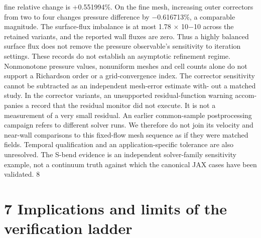 \documentclass[11pt]{article}
\begin{document}
fine relative change is +0.551994\%. On the fine mesh, increasing outer correctors from two to four
changes pressure difference by \ensuremath{-}0.616713\%, a comparable magnitude. The surface-flux imbalance
is at most 1.78 \ensuremath{\times} 10\ensuremath{-}10 across the retained variants, and the reported wall fluxes are zero. Thus
a highly balanced surface flux does not remove the pressure observable’s sensitivity to iteration
settings.
These records do not establish an asymptotic refinement regime. Nonmonotone pressure values,
nonuniform meshes and cell counts alone do not support a Richardson order or a grid-convergence
index. The corrector sensitivity cannot be subtracted as an independent mesh-error estimate with-
out a matched study. In the corrector variants, an unsupported residual-function warning accom-
panies a record that the residual monitor did not execute. It is not a measurement of a very small
residual.
An earlier common-sample postprocessing campaign refers to different solver runs. We therefore
do not join its velocity and near-wall comparisons to this fixed-flow mesh sequence as if they were
matched fields. Temporal qualification and an application-specific tolerance are also unresolved.
The S-bend evidence is an independent solver-family sensitivity example, not a continuum truth
against which the canonical JAX cases have been validated.
8


\section*{7 Implications and limits of the verification ladder}
\end{document}
